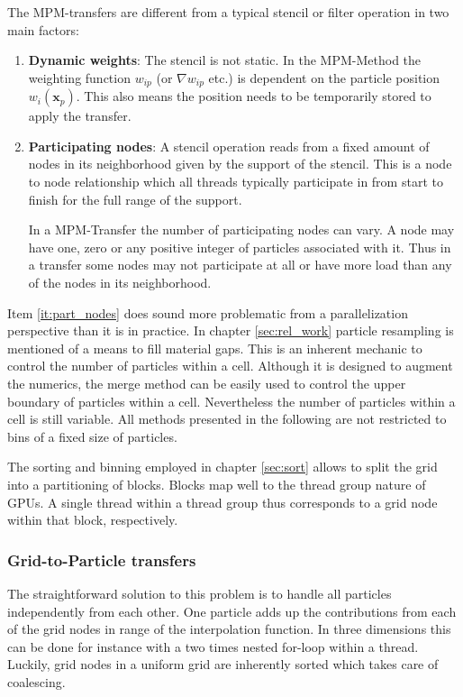 \documentclass[m,times]{cgMA}
\begin{document}
The MPM-transfers are different from a typical stencil or filter operation in two main factors:
\begin{enumerate}
  \item \textbf{Dynamic weights}: The stencil is not static. In the MPM-Method the weighting function $w_{ip}$ (or $\nabla w_{ip}$ etc.) is dependent on the particle position $w_i(\boldsymbol{x}_p)$. This also means the position needs to be temporarily stored to apply the transfer.
  \item \label{it:part_nodes} \textbf{Participating nodes}: A stencil operation reads from a fixed amount of nodes in its neighborhood given by the support of the stencil. This is a node to node relationship which all threads typically participate in from start to finish for the full range of the support.

In a MPM-Transfer the number of participating nodes can vary. A node may have one, zero or any positive integer of particles associated with it. Thus in a transfer some nodes may not participate at all or have more load than any of the nodes in its neighborhood.
\end{enumerate}
Item \ref{it:part_nodes} does sound more problematic from a parallelization perspective than it is in practice. In chapter \ref{sec:rel_work} particle resampling is mentioned of a means to fill material gaps. This is an inherent mechanic to control the number of particles within a cell. Although it is designed to augment the numerics, the merge method can be easily used to control the upper boundary of particles within a cell. Nevertheless the number of particles within a cell is still variable. All methods presented in the following are not restricted to bins of a fixed size of particles.

The sorting and binning employed in chapter \ref{sec:sort} allows to split the grid into a partitioning of blocks. Blocks map well to the thread group nature of GPUs. A single thread within a thread group thus corresponds to a grid node within that block, respectively.

\subsubsection{Grid-to-Particle transfers}\label{sec:g2p}
The straightforward solution to this problem is to handle all particles independently from each other. One particle adds up the contributions from each of the grid nodes in range of the interpolation function. In three dimensions this can be done for instance with a two times nested for-loop within a thread. Luckily, grid nodes in a uniform grid are inherently sorted which takes care of coalescing.
\end{document}
